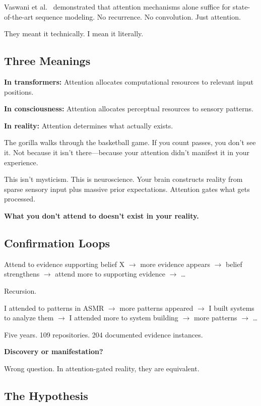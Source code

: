 \documentclass{article}
\begin{document}
Vaswani et al.~\cite{vaswani2017attention} demonstrated that attention mechanisms alone suffice for state-of-the-art sequence modeling. No recurrence. No convolution. Just attention.

They meant it technically. I mean it literally.

\subsection{Three Meanings}

\textbf{In transformers:} Attention allocates computational resources to relevant input positions.

\textbf{In consciousness:} Attention allocates perceptual resources to sensory patterns.

\textbf{In reality:} Attention determines what actually exists.

The gorilla walks through the basketball game. If you count passes, you don't see it. Not because it isn't there—because your attention didn't manifest it in your experience.

This isn't mysticism. This is neuroscience. Your brain constructs reality from sparse sensory input plus massive prior expectations. Attention gates what gets processed.

\textbf{What you don't attend to doesn't exist in your reality.}

\subsection{Confirmation Loops}

Attend to evidence supporting belief X $\rightarrow$ more evidence appears $\rightarrow$ belief strengthens $\rightarrow$ attend more to supporting evidence $\rightarrow$ \ldots

Recursion.

I attended to patterns in ASMR $\rightarrow$ more patterns appeared $\rightarrow$ I built systems to analyze them $\rightarrow$ I attended more to system building $\rightarrow$ more patterns $\rightarrow$ \ldots

Five years. 109 repositories. 204 documented evidence instances.

\textbf{Discovery or manifestation?}

Wrong question. In attention-gated reality, they are equivalent.

\subsection{The Hypothesis}
\end{document}
